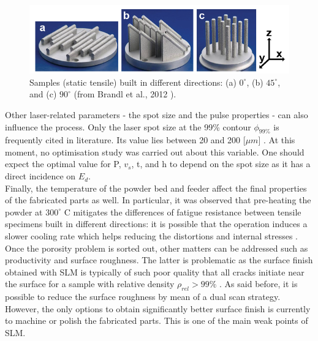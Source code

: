 \begin{figure}[ht]
\centering
\includegraphics[scale=0.58]{Images/Build}
\decoRule
\caption[Samples (static tensile) built in different directions: (a) $0^\circ$, (b) $45^\circ$, and (c) $90^\circ$]{Samples (static tensile) built in different directions: (a) $0^\circ$, (b) $45^\circ$, and (c) $90^\circ$ (from Brandl et al., 2012  \parencite{Brandl121509}).}
\label{fig:Build}
\end{figure}


Other laser-related parameters - the spot size and the pulse properties - can also influence the process. Only the laser spot size at the 99\% contour $\phi_{99\%}$ is frequently cited in literature. Its value lies between 20 and 200 [$\mu m$] \parencite{Brandl121509,Kempen110817,MOWER2016198}. At this moment, no optimisation study was carried out about this variable. One should expect the optimal value for P, $v_s$, t, and h to depend on the spot size as it has a direct incidence on $E_d$. \\

Finally, the temperature of the powder bed and feeder affect the final properties of the fabricated parts as well. In particular, it was observed that pre-heating the powder at $300^\circ$ C mitigates the differences of fatigue resistance between tensile specimens built in different directions: it is possible that the operation induces a slower cooling rate which helps reducing the distortions and internal stresses \parencite{Brandl121509}.\\

Once the porosity problem is sorted out, other matters can be addressed such as productivity and surface roughness. The latter is problematic as the surface finish obtained with SLM is typically of such poor quality that all cracks initiate near the surface for a sample with relative density $\rho_{rel}>99\%$ \parencite{Brandl121509}. As said before, it is possible to reduce the surface roughness by mean of a dual scan strategy. However, the only options to obtain significantly better surface finish is currently to machine or polish the fabricated parts. This is one of the main weak points of SLM.\\ %


